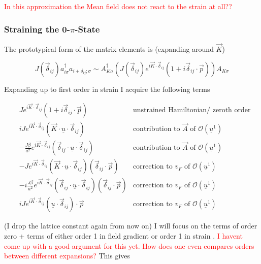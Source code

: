 \documentclass[../../../main.tex]{subfiles}
\begin{document}
\textcolor{red}{In this approximation the Mean field does not react to the strain at all??} 

\subsubsection{Straining the 0-$\pi$-State}

The prototypical form of the matrix elements is (expanding around $\vec{K}$)

\begin{equation}
	J(\vec{\delta}_{ij})a_{i\sigma}^\dagger a_{i+\delta_{ij};\sigma} \sim A_{K\sigma}^\dagger \left(J(\vec{\delta}_{ij})e^{i\vec{K}\cdot\vec{\delta}_{ij}}(1+i\vec{\delta}_{ij}\cdot\vec{p})\right) A_{K\sigma}
\end{equation}

Expanding up to first order in strain I acquire the following terms 


\begin{align*}
	&Je^{i\vec{K}\cdot\vec{\delta}_{ij}}(1+i\vec{\delta}_{ij}\cdot\vec{p}) & \text{unstrained Hamiltonian/ zeroth order} \\
	& iJe^{i\vec{K}\cdot\vec{\delta}_{ij}} \left( \vec{K} \cdot \underline{u} \cdot \vec{\delta}_{ij} \right) & \text{contribution to $\vec{A}$ of $\mathcal{O}\left( \underline{u}^1\right)$} \\
	& -\frac{J\beta}{a^2} e^{i\vec{K}\cdot\vec{\delta}_{ij}} \left( \vec{\delta}_{ij} \cdot \underline{u} \cdot \vec{\delta}_{ij} \right) &\text{contribution to $\vec{A}$ of $\mathcal{O}\left( \underline{u}^1\right)$}   \\
	& -Je^{i\vec{K}\cdot\vec{\delta}_{ij}}\left( \vec{K} \cdot \underline{u} \cdot \vec{\delta}_{ij} \right)\left(\vec{\delta}_{ij}\cdot\vec{p}\right) &\text{correction to $v_F$ of $\mathcal{O}\left( \underline{u}^1 \right)$}\\
	& -i\frac{J\beta}{a^2}e^{i\vec{K}\cdot\vec{\delta}_{ij}}\left(\vec{\delta}_{ij} \cdot \underline{u} \cdot \vec{\delta}_{ij}\right)\left(\vec{\delta}_{ij}\cdot\vec{p}\right) &\text{correction to $v_F$ of $\mathcal{O}\left( \underline{u}^1 \right)$}\\
	& iJe^{i\vec{K}\cdot\vec{\delta}_{ij}}\left(\underline{u}\cdot\vec{\delta}_{ij}\right)\cdot\vec{p} &\text{correction to $v_F$ of $\mathcal{O}\left( \underline{u}^1 \right)$}
\end{align*}

(I drop the lattice constant again from now on) I will focus on the terms of order zero + terms of either order 1 in field gradient or order 1 in strain \cite{Nayga2019}. \textcolor{red}{I havent come up with a good argument for this yet. How does one even compares orders between different expansions?} This gives
\end{document}
